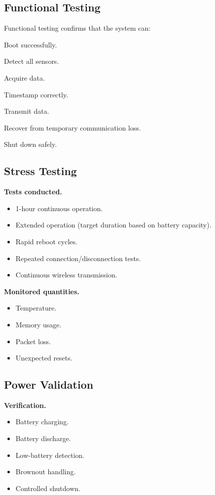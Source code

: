 \subsection{Functional Testing}
\label{sec:functional-testing}

Functional testing confirms that the system can:
\begin{checklist}
    \item Boot successfully.
    \item Detect all sensors.
    \item Acquire data.
    \item Timestamp correctly.
    \item Transmit data.
    \item Recover from temporary communication loss.
    \item Shut down safely.
\end{checklist}

\subsection{Stress Testing}
\label{sec:stress-testing}

\textbf{Tests conducted.}
\begin{itemize}
    \item 1-hour continuous operation.
    \item Extended operation (target duration based on battery capacity).
    \item Rapid reboot cycles.
    \item Repeated connection/disconnection tests.
    \item Continuous wireless transmission.
\end{itemize}

\textbf{Monitored quantities.}
\begin{itemize}
    \item Temperature.
    \item Memory usage.
    \item Packet loss.
    \item Unexpected resets.
\end{itemize}

\subsection{Power Validation}
\label{sec:power-validation}

\textbf{Verification.}
\begin{itemize}
    \item Battery charging.
    \item Battery discharge.
    \item Low-battery detection.
    \item Brownout handling.
    \item Controlled shutdown.
\end{itemize}

